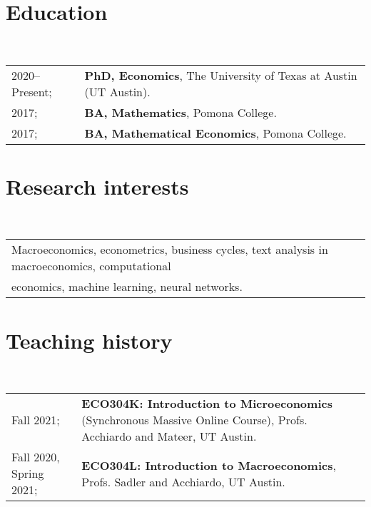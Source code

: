 \documentclass[a4paper, 10pt]{article}
\begin{document}
  \maketitle
  \thispagestyle{firststyle}
  \section{Education}
  ~\begin{tabular}{ll}
    2020--Present; & \textbf{PhD, Economics}, The University of Texas at Austin (UT Austin).\\
    2017; & \textbf{BA, Mathematics}, Pomona College.\\
    2017; & \textbf{BA, Mathematical Economics}, Pomona College.\\
  \end{tabular}
  \vspace*{0.25em}

  \section{Research interests}
  ~\begin{tabular}{l}
    Macroeconomics, econometrics, business cycles, text analysis in macroeconomics, computational\\ 
    economics, machine learning, neural networks.
  \end{tabular}
  \vspace*{0.25em}

  \begin{publications}
      \vspace*{-0.75em}
  \end{publications}
  \vspace*{-0.75em}

  \section{Teaching history}
  ~\begin{tabular}{l p{12cm}}
    Fall 2021; & \textbf{ECO304K: Introduction to Microeconomics} (Synchronous Massive Online Course), Profs. Acchiardo and Mateer, UT Austin.\\
    Fall 2020, Spring 2021; & \textbf{ECO304L: Introduction to Macroeconomics}, Profs. Sadler and Acchiardo, UT Austin.\\
  \end{tabular}
  \vspace*{-0.5em}
\end{document}

